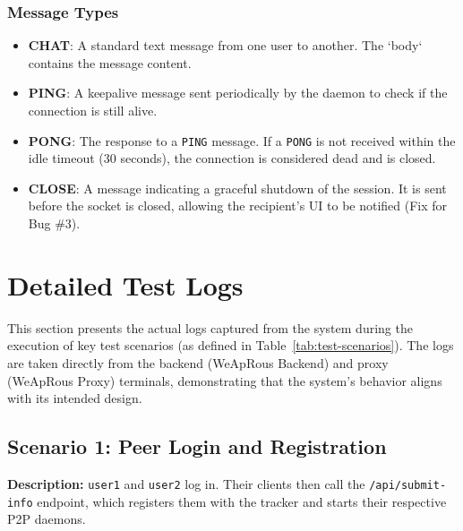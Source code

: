 \subsubsection{Message Types}
\begin{itemize}
    \item \textbf{CHAT}: A standard text message from one user to another. The `body` contains the message content.
    \item \textbf{PING}: A keepalive message sent periodically by the daemon to check if the connection is still alive.
    \item \textbf{PONG}: The response to a \texttt{PING} message. If a \texttt{PONG} is not received within the idle timeout (30 seconds), the connection is considered dead and is closed.
    \item \textbf{CLOSE}: A message indicating a graceful shutdown of the session. It is sent before the socket is closed, allowing the recipient's UI to be notified (Fix for Bug \#3).
\end{itemize}

\section{Detailed Test Logs}
\label{sec:test_logs}

This section presents the actual logs captured from the system during the execution of key test scenarios (as defined in Table~\ref{tab:test-scenarios}). The logs are taken directly from the backend (WeApRous Backend) and proxy (WeApRous Proxy) terminals, demonstrating that the system's behavior aligns with its intended design.

\subsection{Scenario 1: Peer Login and Registration}
\textbf{Description:} \texttt{user1} and \texttt{user2} log in. Their clients then call the \texttt{/api/submit-info} endpoint, which registers them with the tracker and starts their respective P2P daemons.

